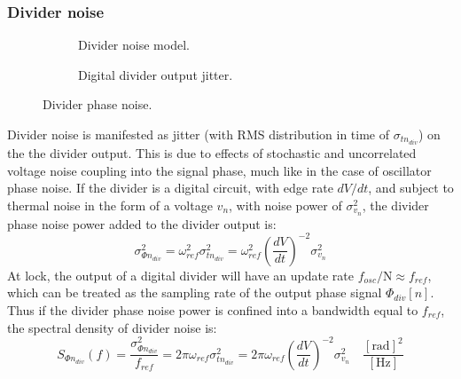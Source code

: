 	\subsubsection{Divider noise}
		\begin{figure}[htb!]
		    \centering
		    \begin{subfigure}{0.5\textwidth}
		        \centering
		        
		        \caption{Divider noise model.}
		        \label{fig:div_pn_model}
		    \end{subfigure}%
		    \begin{subfigure}{0.5\textwidth}
		        \centering
		        
		        \caption{Digital divider output jitter.}
		        \label{fig:div_jitter}
		    \end{subfigure}
		    \label{fig:div_pn}
		    \caption{Divider phase noise.}
		\end{figure}
		\FloatBarrier
		Divider noise is manifested as jitter (with RMS distribution in time of $\sigma_{t n_{div}}$) on the the divider output. This is due to effects of stochastic and uncorrelated voltage noise coupling into the signal phase, much like in the case of oscillator phase noise. If the divider is a digital circuit, with edge rate $dV/dt$, and subject to thermal noise in the form of a  voltage $v_n$, with noise power of $\sigma_{v_n}^2$, the divider phase noise power added to the divider output is:
		\begin{equation}
			\sigma_{\Phi n_{div}}^2 = \omega^2_{ref}\sigma^2_{t n_{div}}  =\omega^2_{ref}\left(\frac{dV}{dt}\right)^{-2}\sigma_{v_n}^2
		\end{equation}
		At lock, the output of a digital divider will have an update rate $f_{{osc}}/\mathrm{N} \approx f_{ref}$, which can be treated as the sampling rate of the output phase signal $\Phi_{div}[n]$. Thus if the divider phase noise power is confined into a bandwidth equal to $f_{ref}$, the spectral density of divider noise is:
		\begin{equation}
			S_{\Phi n_{div}}(f) = \frac{\sigma_{\Phi n_{div}}^2}{f_{ref}} = 2\pi\omega_{ref}\sigma^2_{t n_{div}}  =2\pi\omega_{ref}\left(\frac{dV}{dt}\right)^{-2}\sigma_{v_n}^2\hspace{1em}\frac{[\text{rad}]^2}{[\text{Hz}]}
		\end{equation}

